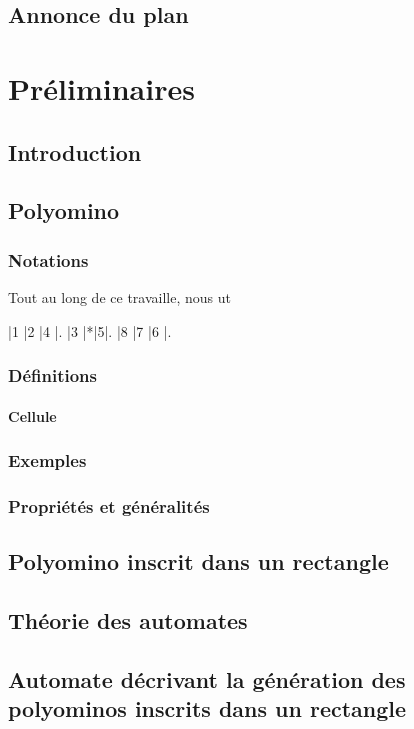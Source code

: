 \documentclass[12pt]{memoireuqam1.3}
\begin{document}
\section{Annonce du plan}
\chapter{Préliminaires}
\section*{Introduction}
\section{Polyomino}
\subsection{Notations}
Tout au long de ce travaille, nous ut
\begin{Puzzle}{3}{3}%
|1 |2 |4 |. |3 |*|5|. |8 |7 |6 |.
\end{Puzzle}
\begin{logicpuzzle}[rows=3,columns=3,color=red!100]
\framepuzzle[black!50]
\end{logicpuzzle}
\subsection{Définitions}
\subsubsection*{Cellule}
\subsection{Exemples}
\subsection{Propriétés et généralités}
\section{Polyomino inscrit dans un rectangle}
\section{Théorie des automates}
\section{Automate décrivant la génération des polyominos inscrits dans un rectangle}
\end{document}
